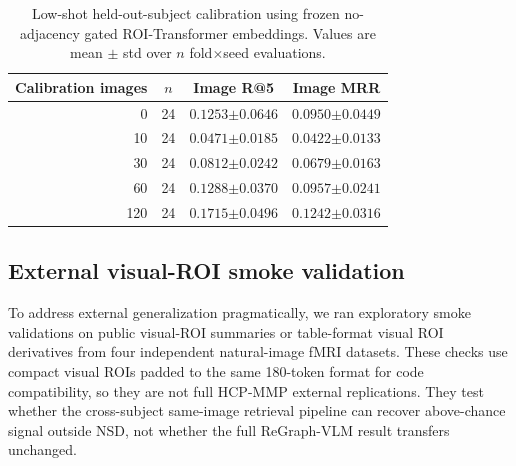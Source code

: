 \documentclass{article}
\begin{document}
\begin{table}[!htbp]
  \centering
  \caption{Low-shot held-out-subject calibration using frozen no-adjacency gated ROI-Transformer embeddings. Values are mean $\pm$ std over $n$ fold$\times$seed evaluations.}
  \label{tab:lowshot}
  \scriptsize
  \setlength{\tabcolsep}{6pt}
  \renewcommand{\arraystretch}{1.15}
  \begin{tabular}{rccc}
    \toprule
    Calibration images & $n$ & Image R@5 & Image MRR \\
    \midrule
    0 & 24 & $0.1253{\scriptstyle\pm0.0646}$ & $0.0950{\scriptstyle\pm0.0449}$ \\
    10 & 24 & $0.0471{\scriptstyle\pm0.0185}$ & $0.0422{\scriptstyle\pm0.0133}$ \\
    30 & 24 & $0.0812{\scriptstyle\pm0.0242}$ & $0.0679{\scriptstyle\pm0.0163}$ \\
    60 & 24 & $0.1288{\scriptstyle\pm0.0370}$ & $0.0957{\scriptstyle\pm0.0241}$ \\
    120 & 24 & $\mathbf{0.1715{\scriptstyle\pm0.0496}}$ & $\mathbf{0.1242{\scriptstyle\pm0.0316}}$ \\
    \bottomrule
  \end{tabular}
\end{table}

\subsection{External visual-ROI smoke validation}

To address external generalization pragmatically, we ran exploratory smoke validations on public visual-ROI summaries or table-format visual ROI derivatives from four independent natural-image fMRI datasets. These checks use compact visual ROIs padded to the same 180-token format for code compatibility, so they are not full HCP-MMP external replications. They test whether the cross-subject same-image retrieval pipeline can recover above-chance signal outside NSD, not whether the full ReGraph-VLM result transfers unchanged.
\end{document}
